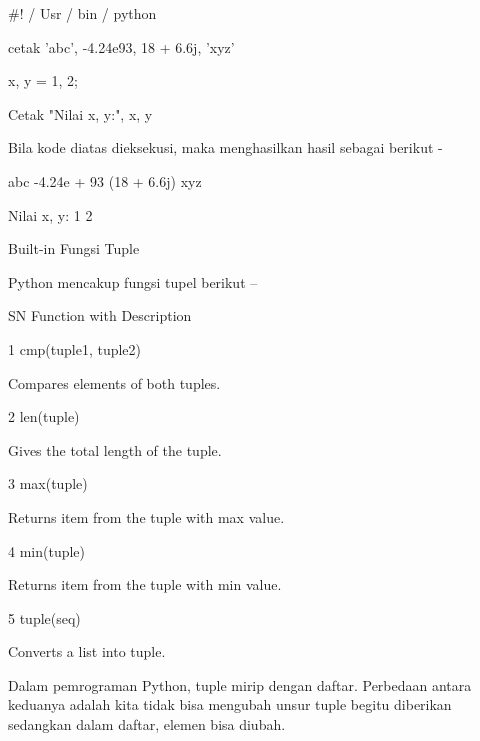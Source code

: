  $  \#  $! / Usr / bin / python \par
\vspace{12pt}
cetak 'abc', -4.24e93, 18 + 6.6j, 'xyz' \par
x, y = 1, 2; \par
Cetak "Nilai x, y:", x, y \par
Bila kode diatas dieksekusi, maka menghasilkan hasil sebagai berikut - \par
abc -4.24e + 93 (18 + 6.6j) xyz \par
Nilai x, y: 1 2 \par
Built-in Fungsi Tuple \par
Python mencakup fungsi tupel berikut – \par
\vspace{12pt}
\vspace{12pt}
\vspace{12pt}
SN \hspace*{0.5in} Function with Description \par
1 \hspace*{0.5in} cmp(tuple1, tuple2) \par
\vspace{12pt}
Compares elements of both tuples. \par
2 \hspace*{0.5in} len(tuple) \par
\vspace{12pt}
Gives the total length of the tuple. \par
3 \hspace*{0.5in} max(tuple) \par
\vspace{12pt}
Returns item from the tuple with max value. \par
4 \hspace*{0.5in} min(tuple) \par
\vspace{12pt}
Returns item from the tuple with min value. \par
5 \hspace*{0.5in} tuple(seq) \par
\vspace{12pt}
Converts a list into tuple. \par
\vspace{12pt}
\vspace{12pt}
\vspace{12pt}
\vspace{12pt}
\vspace{12pt}
Dalam pemrograman Python, tuple mirip dengan daftar. Perbedaan antara keduanya adalah kita tidak bisa mengubah unsur tuple begitu diberikan sedangkan dalam daftar, elemen bisa diubah. \par
